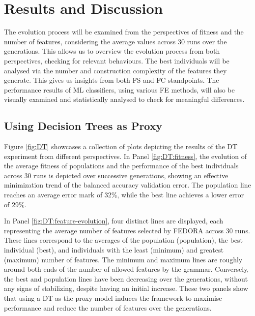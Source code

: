 \section{Results and Discussion}

The evolution process will be examined from the perspectives of fitness and the number of features, considering the average values across 30 runs over the generations. This allows us to overview the evolution process from both perspectives, checking for relevant behaviours. The best individuals will be analysed via the number and construction complexity of the features they generate. This gives us insights from both \gls{FS} and \gls{FC} standpoints. The performance results of \gls{ML} classifiers, using various \gls{FE} methods, will also be visually examined and statistically analysed to check for meaningful differences.

\subsection{Using Decision Trees as Proxy}

Figure \ref{fig:DT} showcases a collection of plots depicting the results of the \gls{DT}  experiment from different perspectives. In Panel \ref{fig:DT:fitness}, the evolution of the average fitness of populations and the performance of the best individuals across 30 runs is depicted over successive generations, showing an effective minimization trend of the balanced accuracy validation error. The population line reaches an average error mark of 32\%, while the best line achieves a lower error of 29\%.

In Panel \ref{fig:DT:feature-evolution}, four distinct lines are displayed, each representing the average number of features selected by FEDORA across 30 runs. These lines correspond to the averages of the population (population), the best individual (best), and individuals with the least (minimum) and greatest (maximum) number of features. The minimum and maximum lines are roughly around both ends of the number of allowed features by the grammar. Conversely, the best and population lines have been decreasing over the generations, without any signs of stabilizing, despite having an initial increase. These two panels show that using a \gls{DT} as the proxy model induces the framework to maximise performance and reduce the number of features over the generations.

